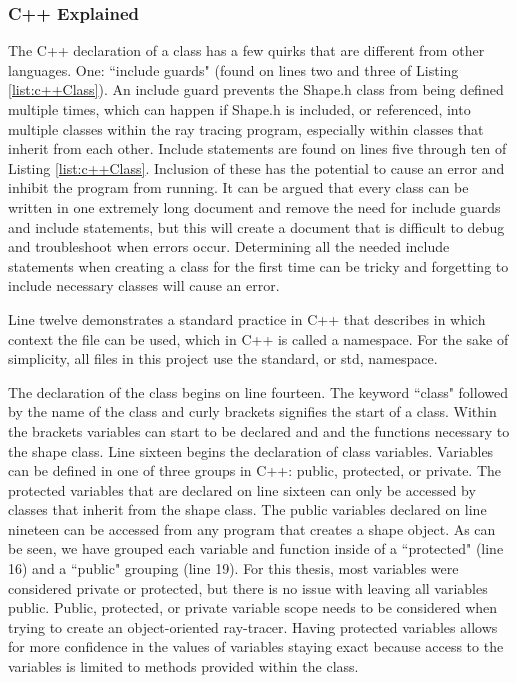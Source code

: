 \subsubsection{C++ Explained}
The C++ declaration of a class has a few quirks that are different from other languages.  One: ``include guards" (found on lines two and three of Listing \ref{list:c++Class}).  An include guard prevents the Shape.h class from being defined multiple times, which can happen if Shape.h is included, or referenced, into multiple classes within the ray tracing program, especially within classes that inherit from each other.   Include statements are found on lines five through ten of Listing \ref{list:c++Class}. Inclusion of these has the potential to cause an error and inhibit the program from running.  It can be argued that every class can be written in one extremely long document and remove the need for include guards and include statements, but this will create a document that is difficult to debug and troubleshoot when errors occur. Determining all the needed include statements when creating a class for the first time can be tricky and forgetting to include necessary classes will cause an error.

Line twelve demonstrates a standard practice in C++ that describes in which context the file can be used, which in C++ is called a namespace.  For the sake of simplicity, all files in this project use the standard, or std, namespace.

The declaration of the class begins on line fourteen.  The keyword ``class" followed by the name of the class and curly brackets signifies the start of a class.  Within the brackets variables can start to be declared and and the functions necessary to the shape class.  Line sixteen begins the declaration of class variables.  Variables can be defined in one of three groups in C++: public, protected, or private.  The protected variables that are declared on line sixteen can only be accessed by classes that inherit from the shape class.  The public variables declared on line nineteen can be accessed from any program that creates a shape object.  As can be seen, we have grouped each variable and function inside of a ``protected" (line 16) and a ``public" grouping (line 19).  For this thesis, most variables were considered private or protected, but there is no issue with leaving all variables public.  Public, protected, or private variable scope needs to be considered when trying to create an object-oriented ray-tracer.  Having protected variables allows for more confidence in the values of variables staying exact because access to the variables is limited to methods provided within the class.

